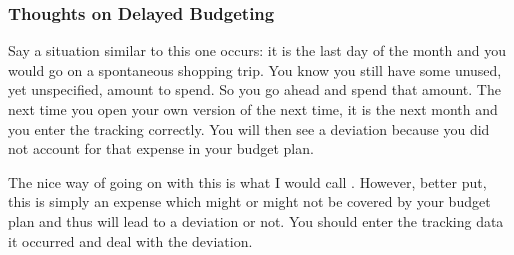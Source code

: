 \subsubsection{Thoughts on Delayed Budgeting}
\label{subsubsec:thoughts-delayed-budgeting}

Say a situation similar to this one occurs:
it is the last day of the month and you would go on a spontaneous shopping trip.
You know you still have some unused, yet unspecified, amount to spend.
So you go ahead and spend that amount.
The next time you open your own version of \tfn the next time, it is the next month and you enter the tracking correctly.
You will then see a deviation because you did not account for that expense in your budget plan.

The nice way of going on with this is what I would call .
However, better put, this is simply an expense which might or might not be covered by your budget plan and thus will lead to a deviation or not.
You should enter the tracking data it occurred and deal with the deviation.